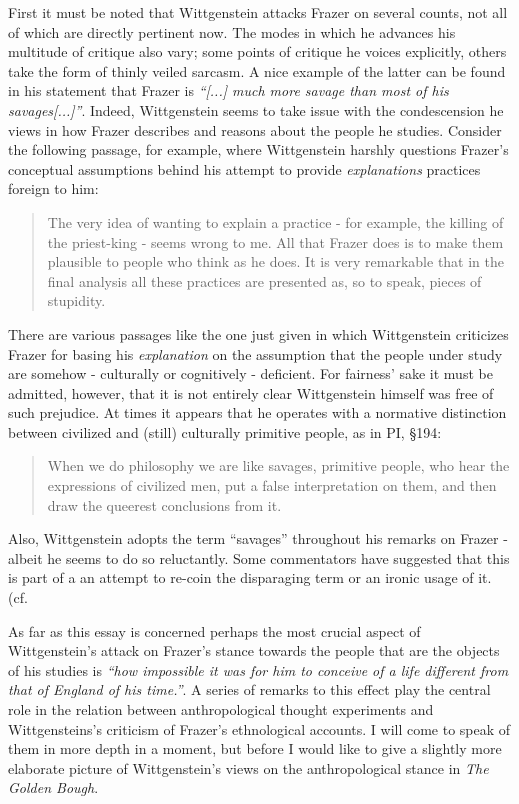 \documentclass{article}
\begin{document}
First it must be noted that Wittgenstein attacks Frazer on several counts, not all of which are directly pertinent now. The modes in which he advances his multitude of critique also vary; some points of critique he voices explicitly, others take the form of thinly veiled sarcasm. A nice example of the latter can be found in his statement that Frazer is \textit{``[...] much more savage than most of his savages[...]''}.
Indeed, Wittgenstein seems to take issue with the condescension he views in how Frazer describes and reasons about the people he studies. Consider the following passage, for example, where Wittgenstein harshly questions Frazer's conceptual assumptions behind his attempt to provide \textit{explanations} practices foreign to him:
 \begin{quote}
 The very idea of wanting to explain a practice - for example, the killing of the priest-king - seems wrong to me. All that Frazer does is to make them plausible to people who think as he does. It is very remarkable that in the final analysis all these practices are presented as, so to speak, pieces of stupidity. %
 \end{quote}
 There are various passages like the one just given in which Wittgenstein criticizes Frazer for basing his \textit{explanation} on the assumption that the people under study are somehow - culturally or cognitively - deficient. For fairness' sake it must be admitted, however, that it is not entirely clear Wittgenstein himself was free of such prejudice. At times it appears that he operates with a normative distinction between civilized and (still) culturally primitive people, as in PI, §194:
\begin{quote}
When we do philosophy we are like savages, primitive people, who hear the expressions of civilized men, put a false interpretation on them, and then draw the queerest conclusions from it.
\end{quote}
 Also, Wittgenstein adopts the term ``savages'' throughout his remarks on Frazer - albeit he seems to do so reluctantly. Some commentators have suggested that this is part of a an attempt to re-coin the disparaging term or an ironic usage of it. (cf. %

As far as this essay is concerned perhaps the most crucial aspect of Wittgenstein's attack on Frazer's stance towards the people that are the objects of his studies is \textit{``how impossible it was for him to conceive of a life different from that of England of his time.''}. A series of remarks to this effect play the central role in the relation between anthropological thought experiments and Wittgensteins's criticism of Frazer's ethnological accounts. I will come to speak of them in more depth in a moment, but before I would like to give a slightly more elaborate picture of Wittgenstein's views on the anthropological stance in \textit{The Golden Bough}.
 
\end{document}
